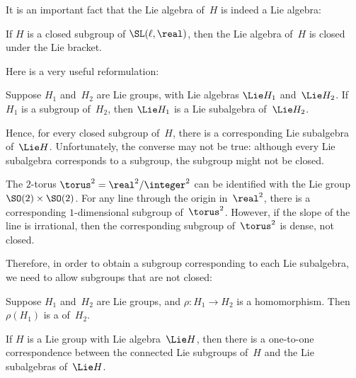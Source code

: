 It is an important fact that the Lie algebra of~$H$ is indeed a Lie algebra:

\begin{prop}
If $H$ is a closed subgroup of\/ $\SL(\ell,\real)$, then the Lie algebra of~$H$ is closed under the Lie bracket.
\end{prop}

Here is a very useful reformulation:

\begin{cor}
Suppose $H_1$ and~$H_2$ are Lie groups, with Lie algebras\/ $\Lie H_1$ and\/~$\Lie H_2$. If $H_1$ is a subgroup of~$H_2$, then\/ $\Lie H_1$ is a Lie subalgebra of\/~$\Lie H_2$.
\end{cor}

Hence, for every closed subgroup of~$H$, there is a corresponding Lie subalgebra of~$\Lie H$. Unfortunately, the converse may not be true: although every Lie subalgebra corresponds to a subgroup, the subgroup might not be closed. 

\begin{eg}
The $2$-torus $\torus^2 = \real^2/\integer^2$ can be identified with the Lie group $\SO(2) \times \SO(2)$. For any line through the origin in~$\real^2$, there is a corresponding $1$-dimensional subgroup of~$\torus^2$. However, if the slope of the line is irrational, then the corresponding subgroup of~$\torus^2$ is dense, not closed.
\end{eg}

Therefore, in order to obtain a subgroup corresponding to each Lie subalgebra, we need to allow subgroups that are not closed:

\begin{defn}
Suppose $H_1$ and~$H_2$ are Lie groups, and $\rho \colon H_1 \to H_2$ is a homomorphism. Then $\rho(H_1)$ is a  of~$H_2$.
\end{defn}

\begin{prop}
If $H$ is a Lie group with Lie algebra\/~$\Lie H$, then there is a one-to-one correspondence between the connected Lie subgroups of~$H$ and the Lie subalgebras of\/~$\Lie H$.
\end{prop}


